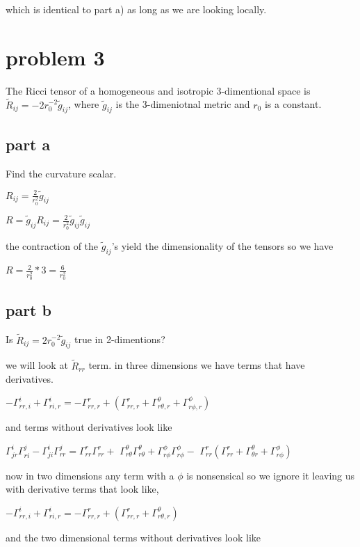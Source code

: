 \documentclass{article}
\begin{document}
which is identical to part a) as long as we are looking locally. 

\newpage 

\section{problem 3}
The Ricci tensor of a homogeneous and isotropic 3-dimentional space is $\tilde{R}_{ij}=-2r_{0}^{-2}\tilde{g}_{ij}$, where $\tilde{g}_{ij}$ is the 3-dimeniotnal metric and $r_{0}$ is a constant.

\subsection{part a}
Find the curvature scalar. 

$R_{ij}=\frac{2}{r_{0}^{2}}\tilde{g}_{ij}$

$R=\tilde{g}_{ij}R_{ij}=\frac{2}{r_{0}^{2}}\tilde{g}_{ij}\tilde{g}_{ij}$

the contraction of the $\tilde{g}_{ij}$'s yield the dimensionality of the tensors so we have 

$R=\frac{2}{r_{0}^{2}}*3=\frac{6}{r_{0}^{2}}$

\subsection{part b}
Is $\tilde{R}_{ij}=2r_{0}^{-2}\tilde{g}_{ij}$ true in 2-dimentions?

we will look at $\tilde{R}_{rr}$ term. in three dimensions we have terms that have derivatives. 

$-\Gamma^{i}_{rr,i}+\Gamma^{i}_{ri,r}=-\Gamma^{r}_{rr,r}+(\Gamma^{r}_{rr,r}+\Gamma^{\theta}_{r\theta ,r}+\Gamma^{\phi}_{r\phi ,r})$

and terms without derivatives look like 

$\Gamma^{i}_{jr}\Gamma^{j}_{ri}-\Gamma^{i}_{ji}\Gamma^{j}_{rr}=\Gamma^{r}_{rr}\Gamma^{r}_{rr}+$
$\Gamma^{\theta}_{r\theta}\Gamma^{\theta}_{r\theta}+\Gamma^{\phi}_{r\phi}\Gamma^{\phi}_{r\phi}-$
$\Gamma^{r}_{rr}(\Gamma^{r}_{rr}+\Gamma^{\theta}_{\theta r}+\Gamma^{\phi}_{r\phi})$

now in two dimensions any term with a $\phi$ is nonsensical so we ignore it leaving us with derivative terms that look like, 

$-\Gamma^{i}_{rr,i}+\Gamma^{i}_{ri,r}=-\Gamma^{r}_{rr,r}+(\Gamma^{r}_{rr,r}+\Gamma^{\theta}_{r\theta ,r})$

and the two dimensional terms without derivatives look like 
\end{document}
